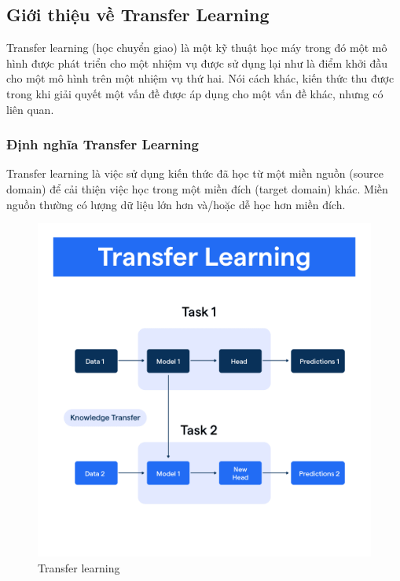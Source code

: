 \subsection{Giới thiệu về Transfer Learning}

Transfer learning (học chuyển giao) là một kỹ thuật học máy trong đó một mô hình được phát triển cho một nhiệm vụ được sử dụng lại như là điểm khởi đầu cho một mô hình trên một nhiệm vụ thứ hai. Nói cách khác, kiến thức thu được trong khi giải quyết một vấn đề được áp dụng cho một vấn đề khác, nhưng có liên quan. 

\subsubsection{Định nghĩa Transfer Learning}

Transfer learning là việc sử dụng kiến thức đã học từ một miền nguồn (source domain) để cải thiện việc học trong một miền đích (target domain) khác. Miền nguồn thường có lượng dữ liệu lớn hơn và/hoặc dễ học hơn miền đích. 

 \begin{figure}[H]
    \centering
    \includegraphics[width=14cm]{Images/Theoretical basis/Transfer_Learning.png}
\caption{Transfer learning}
\end{figure}


